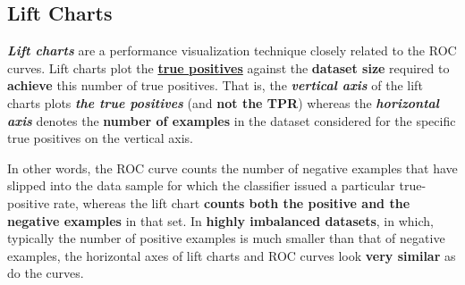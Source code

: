 \documentclass[11pt]{article}
\begin{document}
\subsection{Lift Charts}
\textbf{\emph{Lift charts}} are a performance visualization technique closely related to the ROC curves. Lift charts plot the \underline{\textbf{true positives}} against the \textbf{dataset size} required to \textbf{achieve} this number of true positives. That is, the \emph{\textbf{vertical axis}} of the lift charts plots \textbf{\emph{the true positives}} (and \textbf{not the TPR}) whereas the \emph{\textbf{horizontal axis}} denotes the \textbf{number of examples} in the dataset considered for the specific true positives on the vertical axis. 

In other words, the ROC curve counts the number of negative examples that have slipped into the data sample for which the classifier issued
a particular true-positive rate, whereas the lift chart  \textbf{counts both the positive and the negative examples} in that set.  In \textbf{highly imbalanced datasets}, in which,
typically the number of positive examples is much smaller than that of negative examples, the horizontal axes of lift charts and ROC curves look \textbf{very similar} as do the curves.
\newpage


\end{document}
